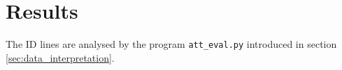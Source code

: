 \chapter{Results \label{ch:results}}
The ID lines are analysed by the program \verb|att_eval.py| introduced in section \ref{sec:data_interpretation}.